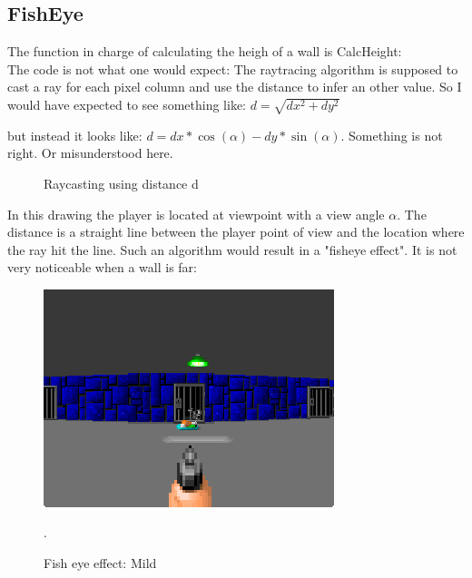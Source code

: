 \documentclass[book.tex]{subfiles}
\begin{document}
\subsection{FishEye}
The function in charge of calculating the heigh of a wall is CalcHeight:\\



The code is not what one would expect: The raytracing algorithm is supposed to cast a ray for each pixel column and use the distance  to infer an other value. So I would have expected to see something like:
\begin{math}
	d = \sqrt{dx^2 + dy^2}
\end{math}

but instead it looks like:
\begin{math}
	d = dx * \cos(\alpha) - dy * \sin(\alpha)
\end{math}.
Something is not right. Or misunderstood here.
\begin{figure}[H]
\centering
 
 \caption{Raycasting using distance d} \label{fig:Raycasting2}
\end{figure}

In this drawing the player is located at viewpoint with a view angle \begin{math}\alpha\end{math}. The distance  is a straight line between the player point of view and the location where the ray hit the line. Such an algorithm would result in a "fisheye effect". It is not very noticeable when a wall is far:

\begin{figure}[H]
\centering
 \includegraphics[scale=1.3]{imgs/fish_eye/bad_mild.png}
 \caption{Fish eye effect: Mild}. \label{fig:mips}
 \end{figure}
\end{document}
